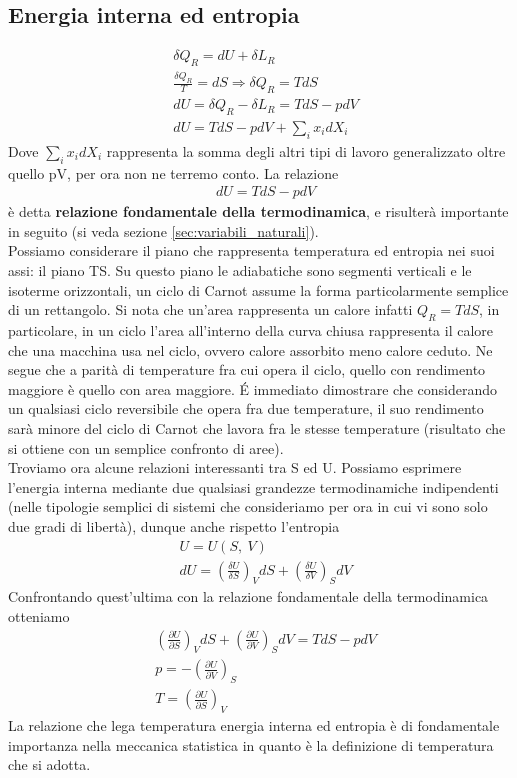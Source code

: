 \documentclass[
10pt, %
a4paper, %
oneside, %
headinclude,footinclude, %
BCOR5mm, %
]{scrartcl}
\begin{document}
\subsection{Energia interna ed entropia}\label{sec:energia_interna_ed_entropia2}

\begin{align*}
	&\delta Q_R = dU + \delta L_R \\
	&\frac{\delta Q_R}{T}=dS\Rightarrow \delta Q_R = TdS\\
	&dU = \delta Q_R - \delta L_R = T dS - pdV\\
	&dU = TdS - pdV+\sum_i x_idX_i
\end{align*}
Dove \(\sum_i x_idX_i\) rappresenta la somma degli altri tipi di lavoro generalizzato oltre quello pV, per ora non ne terremo conto. La relazione
\begin{align}\label{eq:U_variabili_naturali}
	&dU = TdS - pdV
\end{align}
è detta \textbf{relazione fondamentale della termodinamica}, e risulterà importante in seguito (si veda sezione \ref{sec:variabili_naturali}).\\ 
Possiamo considerare il piano che rappresenta temperatura ed entropia nei suoi assi: il piano TS. Su questo piano le adiabatiche sono segmenti verticali e le isoterme orizzontali, un ciclo di Carnot assume la forma particolarmente semplice di un rettangolo. Si nota che un'area rappresenta un calore infatti \(Q_R = TdS\), in particolare, in un ciclo l'area all'interno della curva chiusa rappresenta il calore che una macchina usa nel ciclo, ovvero calore assorbito meno calore ceduto. Ne segue che a parità di temperature fra cui opera il ciclo, quello con rendimento maggiore è quello con area maggiore. \'{E} immediato dimostrare che considerando un qualsiasi ciclo reversibile che opera fra due temperature, il suo rendimento sarà minore del ciclo di Carnot che lavora fra le stesse temperature (risultato che si ottiene con un semplice confronto di aree).\\
Troviamo ora alcune relazioni interessanti tra S ed U. Possiamo esprimere l'energia interna mediante due qualsiasi grandezze termodinamiche indipendenti (nelle tipologie semplici di sistemi che consideriamo per ora in cui vi sono solo due gradi di libertà), dunque anche rispetto l'entropia
\begin{align*}
	&U = U(S,\ V)\\
	&dU = \left(\frac{\delta U}{\delta S}\right)_V dS + \left(\frac{\delta U}{\delta V}\right)_S dV
\end{align*} 
Confrontando quest'ultima con la relazione fondamentale della termodinamica otteniamo 
\begin{align}
	&\left(\frac{\partial U}{\partial S}\right)_V dS + \left(\frac{\partial U}{\partial V}\right)_S dV = TdS-pdV\nonumber\\
	& p=-\left(\frac{\partial U}{\partial V}\right)_S\nonumber\\ 	
	&T = \left(\frac{\partial U}{\partial S}\right)_V\label{eq:temp_statistica}
\end{align}
La relazione che lega temperatura energia interna ed entropia è di fondamentale importanza nella meccanica statistica in quanto è la definizione di temperatura che si adotta. 
\end{document}
